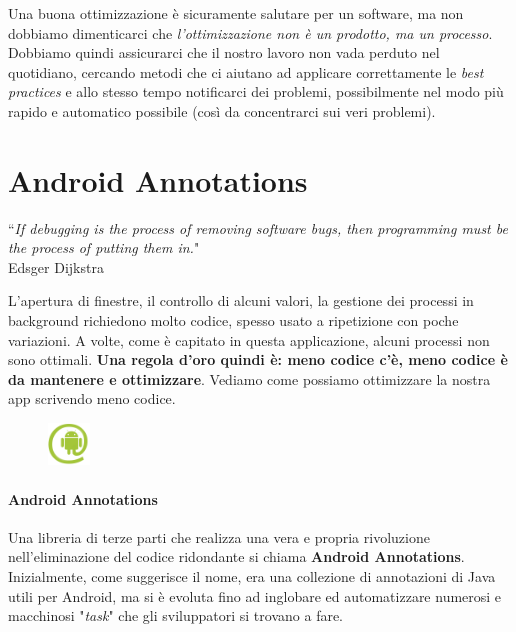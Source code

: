 \documentclass[a4paper,10pt]{memoir}
\begin{document}
Una buona ottimizzazione è sicuramente salutare per un software, ma non dobbiamo dimenticarci che \textit{l'ottimizzazione non è un prodotto, ma un processo}. Dobbiamo quindi assicurarci che il nostro lavoro non vada perduto nel quotidiano, cercando metodi che ci aiutano ad applicare correttamente le \textit{best practices} e allo stesso tempo notificarci dei problemi, possibilmente nel modo più rapido e automatico possibile (così da concentrarci sui veri problemi).

\section{Android Annotations}
\label{section:aa}

\begin{flushright}
``\textit{If debugging is the process of removing software bugs, then programming must be the process of putting them in.}" \\ Edsger Dijkstra
\end{flushright}

L'apertura di finestre, il controllo di alcuni valori, la gestione dei processi in background richiedono molto codice, spesso usato a ripetizione con poche variazioni. A volte, come è capitato in questa applicazione, alcuni processi non sono ottimali. \textbf{Una regola d'oro quindi è: meno codice c'è, meno codice è da mantenere e ottimizzare}. Vediamo come possiamo ottimizzare la nostra app scrivendo meno codice.


\begin{figure}
\includegraphics[width=0.10\textwidth]{dev/aa}
\end{figure}

\paragraph{Android Annotations} Una libreria di terze parti che realizza una vera e propria rivoluzione nell'eliminazione del codice ridondante si chiama \textbf{Android Annotations}. Inizialmente, come suggerisce il nome, era una collezione di annotazioni di Java utili per Android, ma si è evoluta fino ad inglobare ed automatizzare numerosi e macchinosi "\textit{task}" che gli sviluppatori si trovano a fare.

\medskip
\end{document}
